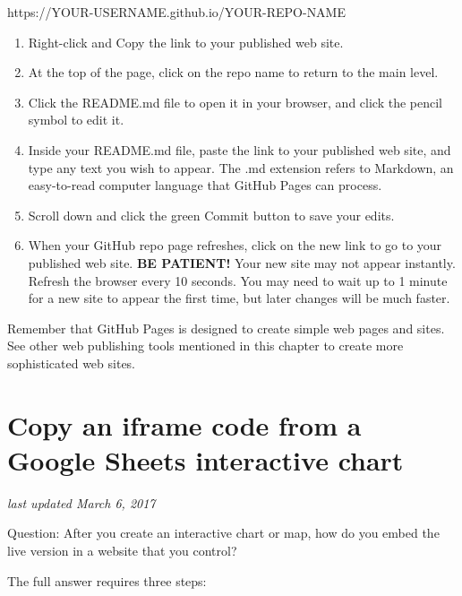 \documentclass[
  english,
]{book}
\newenvironment{Shaded}{\begin{snugshade}}{\end{snugshade}}
\newcommand{\NormalTok}[1]{#1}
\begin{document}
\begin{Shaded}
\begin{Highlighting}[]
\NormalTok{https://YOUR{-}USERNAME.github.io/YOUR{-}REPO{-}NAME}
\end{Highlighting}
\end{Shaded}

\begin{enumerate}
\def\labelenumi{\arabic{enumi})}
\setcounter{enumi}{6}
\item
  Right-click and Copy the link to your published web site.
\item
  At the top of the page, click on the repo name to return to the main level.
\item
  Click the README.md file to open it in your browser, and click the pencil symbol to edit it.
\item
  Inside your README.md file, paste the link to your published web site, and type any text you wish to appear. The .md extension refers to Markdown, an easy-to-read computer language that GitHub Pages can process.
\item
  Scroll down and click the green Commit button to save your edits.
\item
  When your GitHub repo page refreshes, click on the new link to go to your published web site.
  \textbf{BE PATIENT!} Your new site may not appear instantly. Refresh the browser every 10 seconds. You may need to wait up to 1 minute for a new site to appear the first time, but later changes will be much faster.
\end{enumerate}

Remember that GitHub Pages is designed to create simple web pages and sites. See other web publishing tools mentioned in this chapter to create more sophisticated web sites.

\hypertarget{iframe-google-sheets}{%
\section{Copy an iframe code from a Google Sheets interactive chart}\label{iframe-google-sheets}}

\emph{last updated March 6, 2017}

Question: After you create an interactive chart or map, how do you embed the live version in a website that you control?

The full answer requires three steps:
\end{document}
